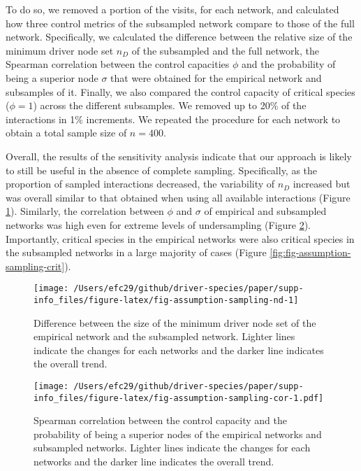 \documentclass[a4paper]{artikel1}
\theoremstyle{definition}
\theoremstyle{definition}
\theoremstyle{definition}
\theoremstyle{remark}
\begin{document}
To do so, we removed a portion of the visits, for each network, and
calculated how three control metrics of the subsampled network compare
to those of the full network. Specifically, we calculated the difference
between the relative size of the minimum driver node set \(n_D\) of the
subsampled and the full network, the Spearman correlation between the
control capacities \(\phi\) and the probability of being a superior node
\(\sigma\) that were obtained for the empirical network and subsamples
of it. Finally, we also compared the control capacity of critical
species (\(\phi=1\)) across the different subsamples. We removed up to
20\% of the interactions in 1\% increments. We repeated the procedure
for each network to obtain a total sample size of \(n=400\).

Overall, the results of the sensitivity analysis indicate that our
approach is likely to still be useful in the absence of complete
sampling. Specifically, as the proportion of sampled interactions
decreased, the variability of \(n_D\) increased but was overall similar
to that obtained when using all available interactions (Figure
\ref{fig:fig-assumption-sampling-nd}). Similarly, the correlation
between \(\phi\) and \(\sigma\) of empirical and subsampled networks was
high even for extreme levels of undersampling (Figure
\ref{fig:fig-assumption-sampling-cor}). Importantly, critical species in
the empirical networks were also critical species in the subsampled
networks in a large majority of cases (Figure
\ref{fig:fig-assumption-sampling-crit}).

\begin{figure}[p]

{\centering \texttt{[image: /Users/efc29/github/driver-species/paper/supp-info\_files/figure-latex/fig-assumption-sampling-nd-1]} 

}

\caption{Difference between the size of the minimum driver node set of the empirical network and the subsampled network. Lighter lines indicate the changes for each networks and the darker line indicates the overall trend.}\label{fig:fig-assumption-sampling-nd}
\end{figure}

\begin{figure}
\centering
\texttt{[image: /Users/efc29/github/driver-species/paper/supp-info\_files/figure-latex/fig-assumption-sampling-cor-1.pdf]}
\caption{\label{fig:fig-assumption-sampling-cor}Spearman correlation between
the control capacity and the probability of being a superior nodes of
the empirical networks and subsampled networks. Lighter lines indicate
the changes for each networks and the darker line indicates the overall
trend.}
\end{figure}
\end{document}

